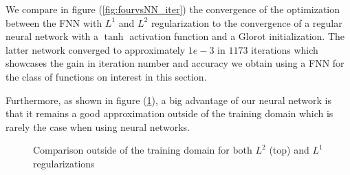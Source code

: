 \documentclass[AMS,STIX1COL]{WileyNJD-v2}
\begin{document}
We compare in figure (\ref{fig:fourvsNN_iter}) the convergence of the optimization between the FNN with $L^1$ and $L^2$ regularization to the convergence of a regular neural network with a $\tanh$ activation function and a Glorot initialization. The latter network converged to approximately $1e-3$ in $1173$ iterations which showcases the gain in iteration number and accuracy we obtain using a FNN for the class of functions on interest in this section.



 Furthermore, as shown in figure (\ref{fig:fourvsNN_outside}), a big advantage of our neural network is that it remains a good approximation outside of the training domain which is rarely the case when using neural networks.
   \begin{figure}[!htb]
    \centering
    \caption{Comparison outside of the training domain for both $L^2$ (top) and $L^1$ regularizations}
    \label{fig:fourvsNN_outside}
\end{figure}
\end{document}

